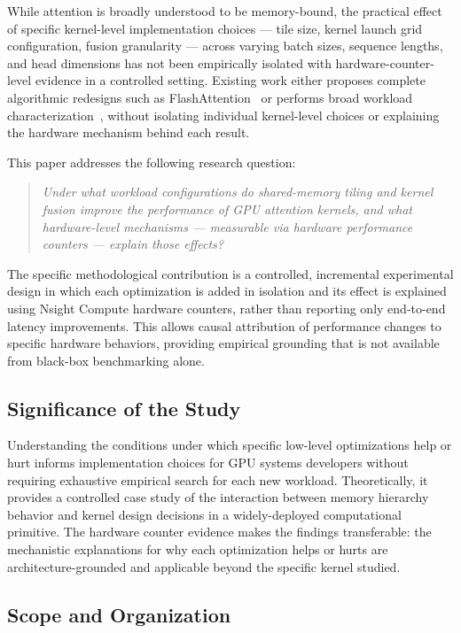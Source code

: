 \documentclass{article}
\begin{document}
While attention is broadly understood to be memory-bound, the practical effect
of specific kernel-level implementation choices — tile size, kernel launch
grid configuration, fusion granularity — across varying batch sizes, sequence
lengths, and head dimensions has not been empirically isolated with
hardware-counter-level evidence in a controlled setting. Existing work either
proposes complete algorithmic redesigns such as
FlashAttention~\cite{dao2022flashattention} or performs broad workload
characterization~\cite{wang2019characterizing}, without isolating individual
kernel-level choices or explaining the hardware mechanism behind each result.

This paper addresses the following research question:
\begin{quote}
  \textit{Under what workload configurations do shared-memory tiling and
  kernel fusion improve the performance of GPU attention kernels, and what
  hardware-level mechanisms — measurable via hardware performance counters —
  explain those effects?}
\end{quote}

The specific methodological contribution is a controlled, incremental
experimental design in which each optimization is added in isolation and
its effect is explained using Nsight Compute hardware counters, rather than
reporting only end-to-end latency improvements. This allows causal attribution
of performance changes to specific hardware behaviors, providing empirical
grounding that is not available from black-box benchmarking alone.

\subsection{Significance of the Study}

Understanding the conditions under which specific low-level optimizations
help or hurt informs implementation choices for GPU systems developers without
requiring exhaustive empirical search for each new workload. Theoretically,
it provides a controlled case study of the interaction between memory hierarchy
behavior and kernel design decisions in a widely-deployed computational
primitive. The hardware counter evidence makes the findings transferable: the
mechanistic explanations for why each optimization helps or hurts are
architecture-grounded and applicable beyond the specific kernel studied.

\subsection{Scope and Organization}
\end{document}

